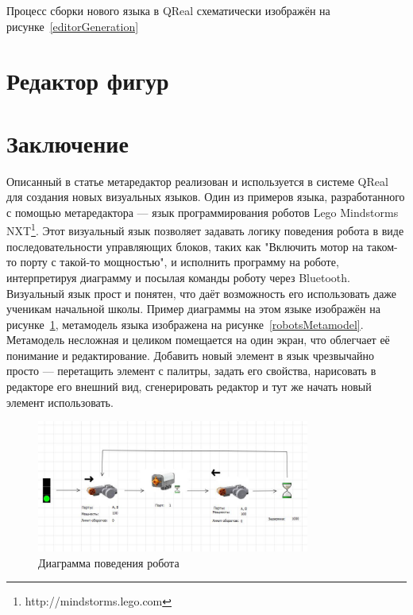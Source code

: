 \documentclass[a4paper]{article}
\begin{document}
Процесс сборки нового языка в QReal схематически изображён на рисунке~\ref{editorGeneration}

\section{Редактор фигур}

\section{Заключение}
Описанный в статье метаредактор реализован и используется в системе QReal для создания новых визуальных языков. Один из примеров языка, разработанного с помощью метаредактора --- язык программирования роботов Lego Mindstorms NXT\footnote{http://mindstorms.lego.com}. Этот визуальный язык позволяет задавать логику поведения робота в виде последовательности управляющих блоков, таких как "Включить мотор на таком-то порту с такой-то мощностью", и исполнить программу на роботе, интерпретируя диаграмму и посылая команды роботу через Bluetooth. Визуальный язык прост и понятен, что даёт возможность его использовать даже ученикам начальной школы. Пример диаграммы на этом языке изображён на рисунке~\ref{robotsDiagram}, метамодель языка изображена на рисунке~\ref{robotsMetamodel}. Метамодель несложная и целиком помещается на один экран, что облегчает её понимание и редактирование. Добавить новый элемент в язык чрезвычайно просто --- перетащить элемент с палитры, задать его свойства, нарисовать в редакторе его внешний вид, сгенерировать редактор и тут же начать новый элемент использовать.

\begin{figure} [ht]
  \begin{center}
    \includegraphics[width=0.8\textwidth]{robotsDiagram.jpg}
    \caption{Диаграмма поведения робота}
    \label{robotsDiagram}
  \end{center}
\end{figure}
\end{document}
